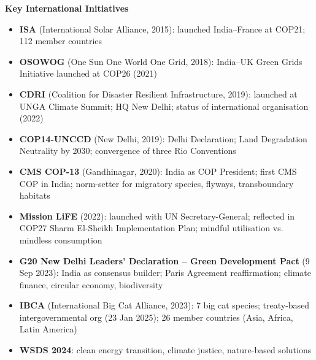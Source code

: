 \textbf{Key International Initiatives}
\begin{itemize}
  \item \textbf{ISA} (International Solar Alliance, 2015): launched India--France at COP21; 112 member countries
  \item \textbf{OSOWOG} (One Sun One World One Grid, 2018): India--UK Green Grids Initiative launched at COP26 (2021)
  \item \textbf{CDRI} (Coalition for Disaster Resilient Infrastructure, 2019): launched at UNGA Climate Summit; HQ New Delhi; status of international organisation (2022)
  \item \textbf{COP14-UNCCD} (New Delhi, 2019): Delhi Declaration; Land Degradation Neutrality by 2030; convergence of three Rio Conventions
  \item \textbf{CMS COP-13} (Gandhinagar, 2020): India as COP President; first CMS COP in India; norm-setter for migratory species, flyways, transboundary habitats
  \item \textbf{Mission LiFE} (2022): launched with UN Secretary-General; reflected in COP27 Sharm El-Sheikh Implementation Plan; mindful utilisation vs. mindless consumption
  \item \textbf{G20 New Delhi Leaders' Declaration -- Green Development Pact} (9 Sep 2023): India as consensus builder; Paris Agreement reaffirmation; climate finance, circular economy, biodiversity
  \item \textbf{IBCA} (International Big Cat Alliance, 2023): 7 big cat species; treaty-based intergovernmental org (23 Jan 2025); 26 member countries (Asia, Africa, Latin America)
  \item \textbf{WSDS 2024}: clean energy transition, climate justice, nature-based solutions
\end{itemize}






